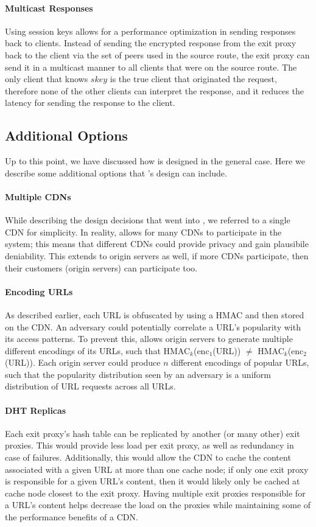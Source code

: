 \paragraph{Multicast Responses}
Using session keys allows for a performance optimization in sending responses back to clients.  Instead of sending 
the encrypted response from the exit proxy back to the client via the set of peers used in the source route, the exit 
proxy can send it in a multicast manner to all clients that were on the source route.  The only client that knows $skey$ 
is the true client that originated the request, therefore none of the other clients can interpret the response, and it reduces the 
latency for sending the response to the client.  

\subsection{Additional Options}
Up to this point, we have discussed how \system{} is designed in the general case.  Here we describe some 
additional options that \system{}'s design can include.

\paragraph{Multiple CDNs}
While describing the design decisions that went into \system{}, we referred to a single CDN for 
simplicity.  In reality, \system{} allows for many CDNs to participate in the system; this means that 
different CDNs could provide privacy and gain plausibile deniability.  This extends to origin servers 
as well, if more CDNs participate, then their customers (origin servers) can participate too.

\paragraph{Encoding URLs}
As described earlier, each URL is obfuscated by using a HMAC and then stored on the CDN.  An adversary 
could potentially correlate a URL's popularity with its access patterns.  To prevent this, \system{} allows 
origin servers to generate multiple different encodings of its URLs, such that HMAC$_k$(enc$_1$(URL)) $\neq$ 
HMAC$_k$(enc$_2$(URL)).  Each origin server could produce $n$ different encodings of popular URLs, such that 
the popularity distribution seen by an adversary is a uniform distribution of URL requests across all URLs.  

\paragraph{DHT Replicas}
Each exit proxy's hash table can be replicated by another (or many other) exit proxies.  This 
would provide less load per exit proxy, as well as redundancy in case of failures.  Additionally, 
this would allow the CDN to cache the content associated with a given URL at more than one cache node; 
if only one exit proxy is responsible for a given URL's content, then it would likely only be cached at 
cache node closest to the exit proxy.  Having multiple exit proxies responsible for a URL's content 
helps decrease the load on the proxies while maintaining some of the performance benefits of a CDN.

